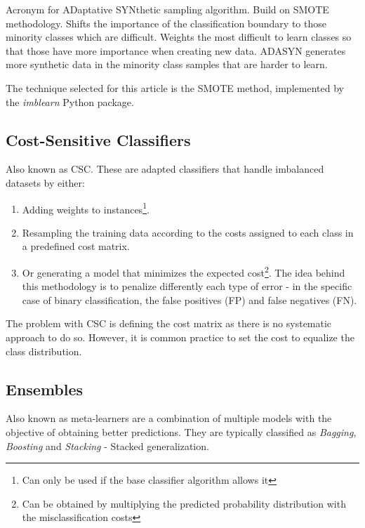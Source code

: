 Acronym for ADaptative SYNthetic sampling algorithm. Build on SMOTE methodology.
Shifts the importance of the classification boundary to those minority classes 
which are difficult. Weights the most difficult to learn classes so that those
have more importance when creating new data. ADASYN generates more synthetic 
data in the minority class samples that are harder to learn.

The technique selected for this article is the SMOTE method, implemented by the 
\textit{imblearn} Python package.

\subsection{Cost-Sensitive Classifiers}\label{subsec:costSensitive}

Also known as CSC. These are adapted classifiers that handle imbalanced 
datasets by either:

\begin{enumerate}
    \item Adding weights to instances\footnote{Can only be used if the base 
    classifier algorithm allows it}.
    \item Resampling the training data according to the costs assigned to each 
    class in a predefined cost matrix.
    \item Or generating a model that minimizes the expected cost\footnote{Can 
    be obtained by multiplying the predicted probability distribution with the 
    misclassification costs}. The idea behind this methodology is to penalize 
    differently each type of error - in the specific case of binary 
    classification, the false positives (FP) and false negatives (FN).
\end{enumerate}

The problem with CSC is defining the cost matrix as there is no systematic 
approach to do so. However, it is common practice to set the cost to equalize 
the class distribution.

\subsection{Ensembles}\label{sec:ensembles}

Also known as meta-learners are a combination of multiple models with the 
objective of obtaining better predictions. They are typically classified as 
\emph{Bagging}, \emph{Boosting} and \emph{\emph{Stacking}} - Stacked 
generalization.


